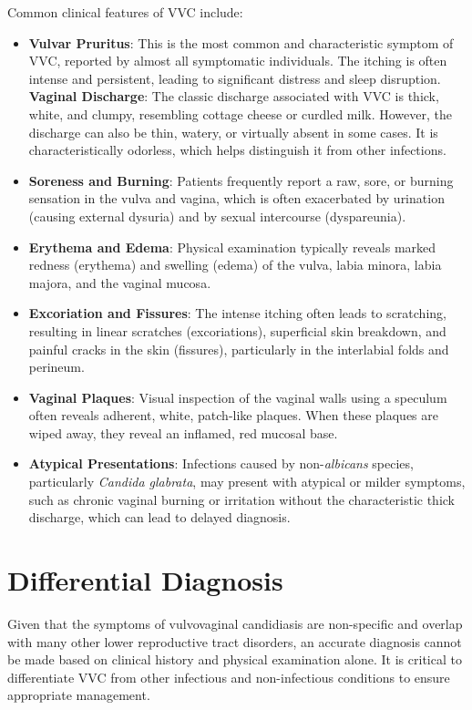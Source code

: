 Common clinical features of VVC include:
\begin{itemize}
    \item \textbf{Vulvar Pruritus}: This is the most common and characteristic symptom of VVC, reported by almost all symptomatic individuals. The itching is often intense and persistent, leading to significant distress and sleep disruption.
    \textbf{Vaginal Discharge}: The classic discharge associated with VVC is thick, white, and clumpy, resembling cottage cheese or curdled milk. However, the discharge can also be thin, watery, or virtually absent in some cases. It is characteristically odorless, which helps distinguish it from other infections.
    \item \textbf{Soreness and Burning}: Patients frequently report a raw, sore, or burning sensation in the vulva and vagina, which is often exacerbated by urination (causing external dysuria) and by sexual intercourse (dyspareunia).
    \item \textbf{Erythema and Edema}: Physical examination typically reveals marked redness (erythema) and swelling (edema) of the vulva, labia minora, labia majora, and the vaginal mucosa.
    \item \textbf{Excoriation and Fissures}: The intense itching often leads to scratching, resulting in linear scratches (excoriations), superficial skin breakdown, and painful cracks in the skin (fissures), particularly in the interlabial folds and perineum.
    \item \textbf{Vaginal Plaques}: Visual inspection of the vaginal walls using a speculum often reveals adherent, white, patch-like plaques. When these plaques are wiped away, they reveal an inflamed, red mucosal base.
    \item \textbf{Atypical Presentations}: Infections caused by non-\textit{albicans} species, particularly \textit{Candida glabrata}, may present with atypical or milder symptoms, such as chronic vaginal burning or irritation without the characteristic thick discharge, which can lead to delayed diagnosis.
\end{itemize}

\section*{Differential Diagnosis}
Given that the symptoms of vulvovaginal candidiasis are non-specific and overlap with many other lower reproductive tract disorders, an accurate diagnosis cannot be made based on clinical history and physical examination alone. It is critical to differentiate VVC from other infectious and non-infectious conditions to ensure appropriate management.

